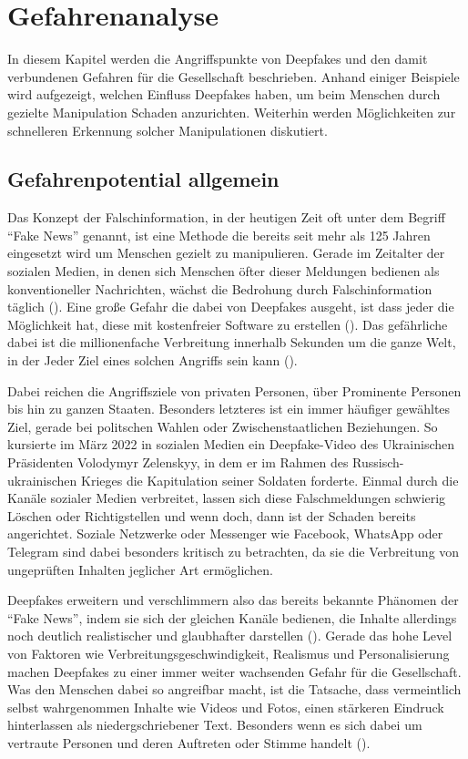 \section{Gefahrenanalyse}
In diesem Kapitel werden die Angriffspunkte von Deepfakes und den damit verbundenen Gefahren für die Gesellschaft beschrieben.
Anhand einiger Beispiele wird aufgezeigt, welchen Einfluss Deepfakes haben, um beim Menschen durch gezielte Manipulation Schaden anzurichten.
Weiterhin werden Möglichkeiten zur schnelleren Erkennung solcher Manipulationen diskutiert.
\subsection{Gefahrenpotential allgemein}
Das Konzept der Falschinformation, in der heutigen Zeit oft unter dem Begriff ``Fake News'' genannt, ist eine Methode die bereits seit mehr als 125 Jahren eingesetzt wird um Menschen gezielt zu manipulieren.
Gerade im Zeitalter der sozialen Medien, in denen sich Menschen öfter dieser Meldungen bedienen als konventioneller Nachrichten, wächst die Bedrohung durch Falschinformation täglich (\cite{Lee2019}).
Eine große Gefahr die dabei von Deepfakes ausgeht, ist dass jeder die Möglichkeit hat, diese mit kostenfreier Software zu erstellen (\cite{Appel2022}).
Das gefährliche dabei ist die millionenfache Verbreitung innerhalb Sekunden um die ganze Welt, in der Jeder Ziel eines solchen Angriffs sein kann (\cite{Shahzad2022}).
\par
Dabei reichen die Angriffsziele von privaten Personen, über Prominente Personen bis hin zu ganzen Staaten.
Besonders letzteres ist ein immer häufiger gewähltes Ziel, gerade bei politschen Wahlen oder Zwischenstaatlichen Beziehungen.
So kursierte im März 2022 in sozialen Medien ein Deepfake-Video des Ukrainischen Präsidenten Volodymyr Zelenskyy, in dem er im Rahmen des Russisch-ukrainischen Krieges die Kapitulation seiner Soldaten forderte.
Einmal durch die Kanäle sozialer Medien verbreitet, lassen sich diese Falschmeldungen schwierig Löschen oder Richtigstellen und wenn doch, dann ist der Schaden bereits angerichtet.
Soziale Netzwerke oder Messenger wie Facebook, WhatsApp oder Telegram sind dabei besonders kritisch zu betrachten, da sie die Verbreitung von ungeprüften Inhalten jeglicher Art ermöglichen.
\par
Deepfakes erweitern und verschlimmern also das bereits bekannte Phänomen der ``Fake News'', indem sie sich der gleichen Kanäle bedienen, die Inhalte allerdings noch deutlich realistischer und glaubhafter darstellen (\cite{Appel2022}).
Gerade das hohe Level von Faktoren wie Verbreitungsgeschwindigkeit, Realismus und Personalisierung machen Deepfakes zu einer immer weiter wachsenden Gefahr für die Gesellschaft.
Was den Menschen dabei so angreifbar macht, ist die Tatsache, dass vermeintlich selbst wahrgenommen Inhalte wie Videos und Fotos, einen stärkeren Eindruck hinterlassen als niedergschriebener Text.
Besonders wenn es sich dabei um vertraute Personen und deren Auftreten oder Stimme handelt (\cite{Kietzmann2020}).
